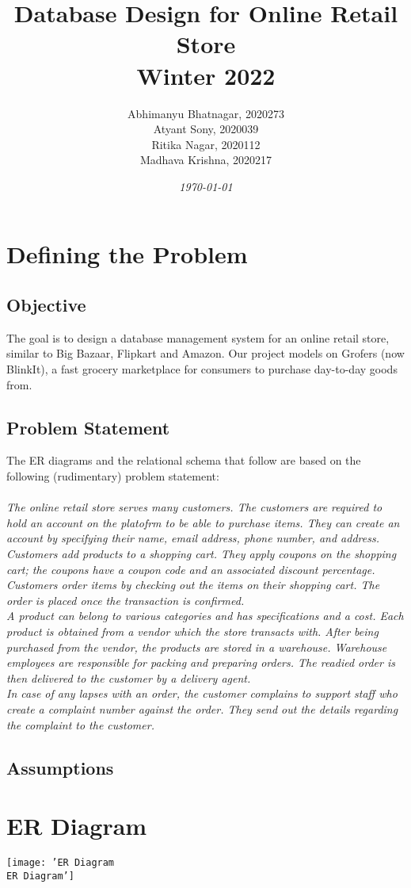 \documentclass[12pt]{report}
\title{
    \textbf{Database Design for Online Retail Store\\ Winter 2022 \\}
}
\author{Abhimanyu Bhatnagar, 2020273
        \\Atyant Sony, 2020039
        \\Ritika Nagar, 2020112
        \\Madhava Krishna, 2020217}
\date{\textit{\today}}
\begin{document}
    \maketitle
    
    \tableofcontents
    \listoffigures
    \pagebreak

    \chapter{Defining the Problem}
    \section{Objective}
        The goal is to design a database management system for an online retail store,
        similar to Big Bazaar, Flipkart and Amazon. Our project models on Grofers (now BlinkIt), 
        a fast grocery marketplace for consumers to purchase day-to-day goods from.
    
    \section{Problem Statement}
    The ER diagrams and the relational schema that follow are based on the following (rudimentary) problem statement:
    \\\\
    \textit{
        The online retail store serves many customers. 
        The customers are required to hold an account on the platofrm to be able to purchase items.
        They can create an account by specifying their name, email address, phone number, and address.
        Customers add products to a shopping cart. They apply coupons on the shopping cart; the coupons 
        have a coupon code and an associated discount percentage.\\
        Customers order items by checking out the items on their shopping cart. The order is placed once the
         transaction is confirmed.
        \\
        A product can belong to various categories and has specifications and a cost. Each
        product is obtained from a vendor which the store transacts with. After being purchased from 
        the vendor, the products are stored in a warehouse. Warehouse employees are responsible for packing 
        and preparing orders. The readied order is then delivered to the customer by a delivery agent.
        \\
        In case of any lapses with an order, the customer complains to support staff who create a complaint
        number against the order. They send out the details regarding the complaint to the customer.
    }
    
    \section{Assumptions}
    

    \chapter{ER Diagram}
    \texttt{[image: 'ER Diagram\\ER Diagram']}
\end{document}
